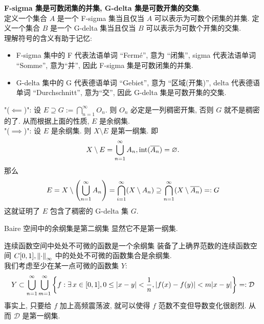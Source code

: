         \begin{rmk}
            [Dedicatia]
            \textbf{F-sigma 集是可数闭集的并集, G-delta 集是可数开集的交集}.\\
            定义一个集合 \(A\) 是一个 F-sigma 集当且仅当 \(A\) 可以表示为可数个闭集的并集. 定义一个集合 \(B\) 是一个 G-delta 集当且仅当 \(B\) 可以表示为可数个开集的交集.\\
            理解符号的含义有助于记忆:
            \begin{itemize}
                \item F-sigma 集中的 F 代表法语单词 ``Fermé'', 意为 ``闭集'', sigma 代表法语单词 ``Somme'', 意为``并'', 因此 F-sigma 集是可数闭集的并集.
                \item G-delta 集中的 G 代表德语单词 ``Gebiet'', 意为 ``区域(开集)'', delta 代表德语单词 ``Durchschnitt'', 意为``交'', 因此 G-delta 集是可数开集的交集.
            \end{itemize}
        \end{rmk}

        \begin{prf}
            "(\(\impliedby\))": 设 \(E\supseteq G:=\bigcap_{n=1}^{\infty} O_n\). 则 \(O_n\) 必定是一列稠密开集, 否则 \(G\) 就不是稠密的了. 从而根据上面的性质, \(E\) 是余纲集. \\
            "(\(\implies\))": 设 \(E\) 是余纲集. 则 \(X\setminus E\) 是第一纲集. 即
            \[X\setminus E=\bigcup_{n=1}^{\infty} A_n, \operatorname{int}(\overline{A_n})=\varnothing.\]
            那么
            \[E=X\setminus\qty(\bigcup_{n=1}^{\infty}A_n)=\bigcap_{i=1}^{\infty}(X\setminus A_n)\supseteq\bigcap_{n=1}^{\infty}(X\setminus\overline{A_n} )=:G \]
            这就证明了 \(E\) 包含了稠密的 G-delta 集 \(G\).
        \end{prf}

        \begin{ppt}
            {Baire 空间中的余纲集是第二纲集}
            显然它不是第一纲集.
        \end{ppt}

        \begin{ins}
            {连续函数空间中处处不可微的函数是一个余纲集}
            装备了上确界范数的连续函数空间 \(C[0,1], \norm{\cdot}_{\infty}\) 中的处处不可微的函数集合是余纲集.\\
            我们考虑至少在某一点可微的函数集 \(Y\):
            \[Y\subset\bigcup_{n=1}^{\infty} \bigcup_{m=1}^{\infty} \qty{f:\exists\,x\in[0,1], 0\leq |x-y|<\frac{1}{n}, |f(x)-f(y)|<m|x-y| }=:\mathcal{D} \]
            事实上, 只要给 \(f\) 加上高频震荡波, 就可以使得 \(f\) 范数不变但导数变化很剧烈. 从而 \(\mathcal{D}\) 是第一纲集.
        \end{ins}

